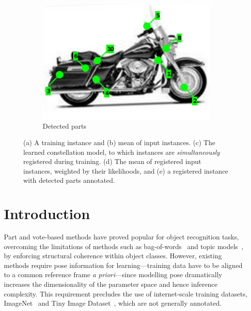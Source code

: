 \begin{figure}[ht]
\begin{subfigure}[b]{0.19\linewidth}
	\includegraphics[width=\linewidth]{fig/3dreg/onebike_after3.pdf}
	\caption{Detected parts}
\end{subfigure}
\caption{(a) A training instance and (b) mean of input instances. (c) The learned constellation model, to which instances are \emph{simultaneously} registered during training. (d) The mean of registered input instances, weighted by their likelihoods, and (e) a registered instance with detected parts annotated.}
\label{fig:concept}
\end{figure}

\section{Introduction}
\label{sec:intro}

Part and vote-based methods have proved popular for object recognition tasks, overcoming the limitations of methods such as bag-of-words~\cite{Sivic2005, Fei-Fei2005} and topic models~\cite{Fergus2005}, by enforcing structural coherence within object classes. However, existing methods require pose information for learning---training data have to be aligned to a common reference frame \emph{a priori}---since modelling pose dramatically increases the dimensionality of the parameter space and hence inference complexity. This requirement precludes the use of internet-scale training datasets, \eg ImageNet~\cite{Deng2009} and Tiny Image Dataset~\cite{Torralba2008}, which are not generally annotated.


